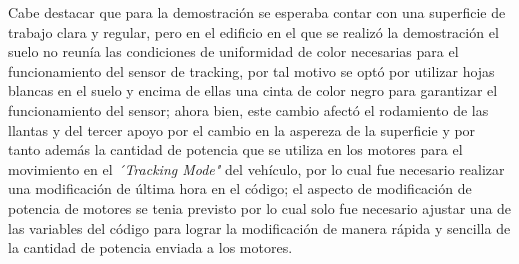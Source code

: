 Cabe destacar que para la demostración se esperaba contar con una superficie de trabajo clara y regular, pero en el edificio en el que se realizó la demostración el suelo no reunía las condiciones de uniformidad de color necesarias para el funcionamiento del sensor de tracking, por tal motivo se optó por utilizar hojas blancas en el suelo y encima de ellas una cinta de color negro para garantizar el funcionamiento del sensor; ahora bien, este cambio afectó el rodamiento de las llantas y del tercer apoyo por el cambio en la aspereza de la superficie y por tanto además la cantidad de potencia que se utiliza en los motores para el movimiento en el \textit{\´´Tracking Mode"} del vehículo, por lo cual fue necesario realizar una modificación de última hora en el código; el aspecto de modificación de potencia de motores se tenia previsto por lo cual solo fue necesario ajustar una de las variables del código para lograr la modificación de manera rápida y sencilla de la cantidad de potencia enviada a los motores.
